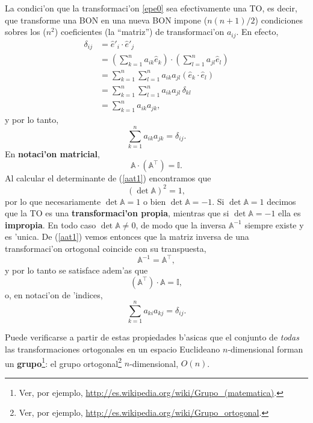 La condici'on que la transformaci'on \eqref{epe0} sea efectivamente una TO, es decir, que transforme una BON en una nueva BON impone ($n(n+1)/2$) condiciones sobres los ($n^2$) coeficientes (la ``matriz'') de transformaci'on $a_{ij}$. En efecto,
\begin{align}
\delta_{ij} &= \hat{e}'_i\cdot \hat{e}'_j \\
&= \left(\sum_{k=1}^na_{ik}\hat{e}_k\right)\cdot \left(\sum_{l=1}^na_{jl}\hat{e}_l\right) \\
&=\sum_{k=1}^n\sum_{l=1}^n a_{ik}a_{jl}\left(\hat{e}_k\cdot \hat{e}_l\right) \\
&= \sum_{k=1}^n\sum_{l=1}^na_{ik}a_{jl}\,\delta_{kl} \\
&= \sum_{k=1}^na_{ik}a_{jk}, 
\end{align}
y por lo tanto,
\begin{equation}\label{aad1}
\boxed{\sum_{k=1}^n a_{ik}a_{jk}=\delta_{ij}.}
\end{equation}
En \textbf{notaci'on matricial}, 
\begin{equation} \label{aat1}
\mathbb{A}\cdot(\mathbb{A}^\top)=\mathbb{I}.
\end{equation}
Al calcular el determinante de (\ref{aat1}) encontramos que
\begin{equation}
(\det\mathbb{A})^2=1,
\end{equation}
por lo que necesariamente $\det\mathbb{A}=1$ o bien $\det\mathbb{A}=-1$. Si $\det\mathbb{A}=1$ decimos que la TO es una \textbf{transformaci'on propia}, mientras que si $\det\mathbb{A}=-1$ ella es \textbf{impropia}. En todo caso $\det\mathbb{A}\neq 0$, de modo que la inversa $\mathbb{A}^{-1}$ siempre existe y es 'unica. De  (\ref{aat1}) vemos entonces que la matriz inversa de una transformaci'on ortogonal coincide con su transpuesta,
\begin{equation}\label{corto}
\mathbb{A}^{-1}=\mathbb{A}^\top ,
\end{equation}
y por lo tanto se satisface adem'as que
\begin{equation} \label{ata1}
(\mathbb{A}^\top)\cdot\mathbb{A}=\mathbb{I},
\end{equation}
o, en notaci'on de 'indices,
\begin{equation}\label{aakd2}
\boxed{\sum_{k=1}^n a_{ki}a_{kj}=\delta_{ij}.}
\end{equation}

Puede verificarse a partir de estas propiedades b'asicas que el conjunto de \textit{todas} las transformaciones ortogonales en un espacio Euclideano $n$-dimensional forman un \textbf{grupo}\footnote{Ver, por ejemplo, \url{http://es.wikipedia.org/wiki/Grupo_(matematica)}.}: el grupo ortogonal\footnote{Ver, por ejemplo, \url{http://es.wikipedia.org/wiki/Grupo_ortogonal}.} $n$-dimensional, $O(n)$.


